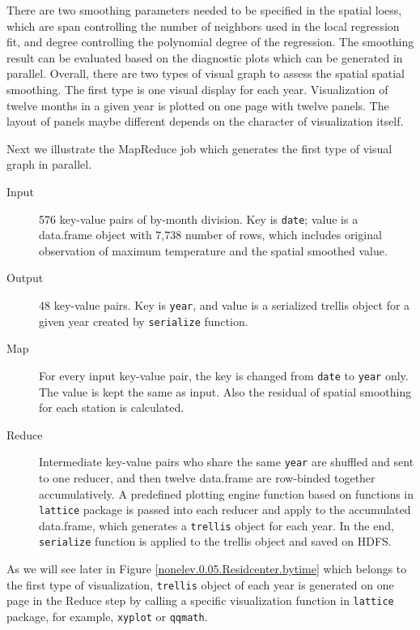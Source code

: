 There are two smoothing parameters needed to be specified in the spatial loess, 
which are span controlling the number of neighbors used in the local regression 
fit, and degree controlling the polynomial degree of the regression. The 
smoothing result can be evaluated based on the diagnostic plots which can be 
generated in parallel. Overall, there are two types of visual graph to assess the
spatial spatial smoothing. The first type is one visual display for each year. 
Visualization of twelve months in a given year is plotted on one page with twelve 
panels. The layout of panels maybe different depends on the character of 
visualization itself. 

Next we illustrate the MapReduce job which generates the first type of visual 
graph in parallel.

\begin{description}
  \item[Input] 576 key-value pairs of by-month division. Key is \texttt{date}; 
  value is a data.frame object with 7,738 number of rows, which includes original
  observation of maximum temperature and the spatial smoothed value. 
  \item[Output] 48 key-value pairs. Key is \texttt{year}, and value is a serialized
  trellis object for a given year created by \texttt{serialize} function.
  \item[Map]For every input key-value pair, the key is changed from \texttt{date} 
  to \texttt{year} only. The value is kept the same as input. Also the residual 
  of spatial smoothing for each station is calculated.
  \item[Reduce] Intermediate key-value pairs who share the same \texttt{year} are
  shuffled and sent to one reducer, and then twelve data.frame are row-binded 
  together accumulatively. A predefined plotting engine function based on 
  functions in \texttt{lattice} package is passed into each reducer and apply to 
  the accumulated data.frame, which generates a \texttt{trellis} object for each 
  year. In the end, \texttt{serialize} function is applied to the trellis object 
  and saved on HDFS.
\end{description}

As we will see later in Figure 
\href{../plots/a1950/spaimpute/nonelev/span0.05/a1950.spaResidcenter.bytime.pdf}
{\ref*{nonelev.0.05.Residcenter.bytime}} which belongs to the first type of 
visualization, \texttt{trellis} object of each year is generated on one page in 
the Reduce step by calling a specific visualization function in \texttt{lattice} 
package, for example, \texttt{xyplot} or \texttt{qqmath}.


